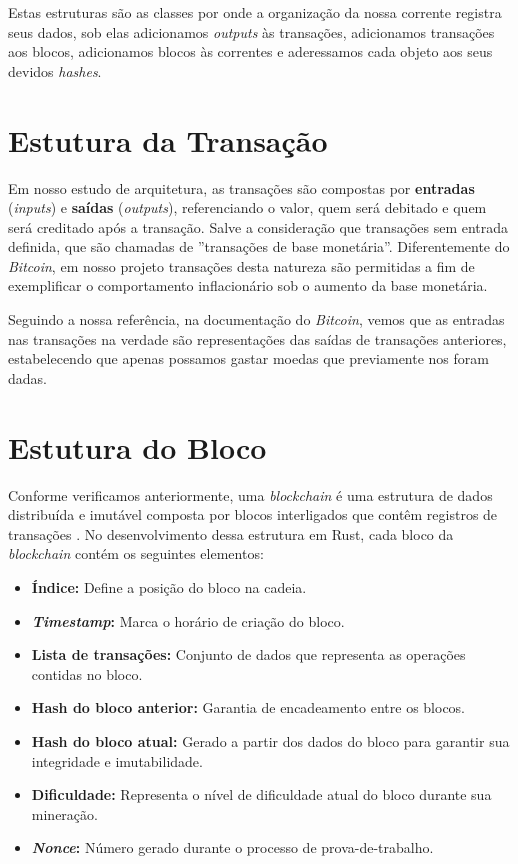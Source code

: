Estas estruturas são as classes por onde a organização da nossa corrente registra seus dados, sob elas adicionamos \textit{outputs} às transações, adicionamos transações aos blocos, adicionamos blocos às correntes e aderessamos cada objeto aos seus devidos \textit{hashes}.

\section*{Estutura da Transação}
Em nosso estudo de arquitetura, as transações são compostas por 
\textbf{entradas} (\textit{inputs}) e \textbf{saídas} (\textit{outputs}), referenciando o valor, quem será debitado e quem será creditado após a transação. Salve a consideração que transações sem entrada definida, que são chamadas de ''transações de base monetária''. Diferentemente do \textit{Bitcoin}, em nosso projeto transações desta natureza são permitidas a fim de exemplificar o comportamento inflacionário sob o aumento da base monetária.

Seguindo a nossa referência, na documentação do \textit{Bitcoin}, vemos que as entradas nas transações na verdade são representações das saídas de transações anteriores, estabelecendo que apenas possamos gastar moedas que previamente nos foram dadas. 

\section*{Estutura do Bloco}

Conforme verificamos anteriormente, uma \textit{blockchain} é uma estrutura de dados distribuída e imutável composta por blocos interligados que contêm registros de transações \cite{nakamoto2008bitcoin}. No desenvolvimento dessa estrutura em Rust, cada bloco da \textit{blockchain} contém os seguintes elementos:
\begin{itemize}
     \item \textbf{Índice:} Define a posição do bloco na cadeia.
     \item \textbf{\textit{Timestamp}:} Marca o horário de criação do bloco.
     \item \textbf{Lista de transações:} Conjunto de dados que representa as operações contidas no bloco.
     \item \textbf{Hash do bloco anterior:} Garantia de encadeamento entre os blocos.
     \item \textbf{Hash do bloco atual:} Gerado a partir dos dados do bloco para garantir sua integridade e imutabilidade.
     \item \textbf{Dificuldade:} Representa o nível de dificuldade atual do bloco durante sua mineração.
     \item  \textbf{\textit{Nonce}:} Número gerado durante o processo de prova-de-trabalho.
     
\end{itemize}

